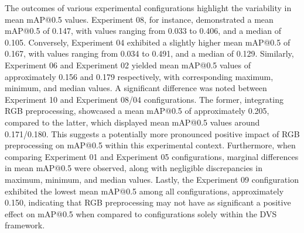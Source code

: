 \documentclass[sigchi,screen]{acmart}
\begin{document}
The outcomes of various experimental configurations highlight the variability in mean mAP@0.5 values. Experiment 08, for instance, demonstrated a mean mAP@0.5 of 0.147, with values ranging from 0.033 to 0.406, and a median of 0.105. Conversely, Experiment 04 exhibited a slightly higher mean mAP@0.5 of 0.167, with values ranging from 0.034 to 0.491, and a median of 0.129. Similarly, Experiment 06 and Experiment 02 yielded mean mAP@0.5 values of approximately 0.156 and 0.179 respectively, with corresponding maximum, minimum, and median values. A significant difference was noted between Experiment 10 and Experiment 08/04 configurations. The former, integrating RGB preprocessing, showcased a mean mAP@0.5 of approximately 0.205, compared to the latter, which displayed mean mAP@0.5 values around 0.171/0.180. This suggests a potentially more pronounced positive impact of RGB preprocessing on mAP@0.5 within this experimental context. Furthermore, when comparing Experiment 01 and Experiment 05 configurations, marginal differences in mean mAP@0.5 were observed, along with negligible discrepancies in maximum, minimum, and median values. Lastly, the Experiment 09 configuration exhibited the lowest mean mAP@0.5 among all configurations, approximately 0.150, indicating that RGB preprocessing may not have as significant a positive effect on mAP@0.5 when compared to configurations solely within the DVS framework.
\end{document}
